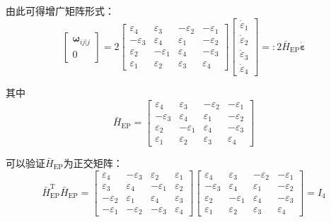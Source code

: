 由此可得增广矩阵形式：
\begin{equation}
\begin{bmatrix}
\boldsymbol{\omega}_{ij|j} \\ 0
\end{bmatrix}
= 2
\begin{bmatrix}
\varepsilon_4  & \varepsilon_3  & -\varepsilon_2 & -\varepsilon_1 \\
-\varepsilon_3 & \varepsilon_4  & \varepsilon_1  & -\varepsilon_2 \\
\varepsilon_2  & -\varepsilon_1 & \varepsilon_4  & -\varepsilon_3 \\
\varepsilon_1  & \varepsilon_2  & \varepsilon_3  & \varepsilon_4
\end{bmatrix}
\begin{bmatrix}
\dot{\varepsilon}_1 \\ \dot{\varepsilon}_2 \\ \dot{\varepsilon}_3 \\ \dot{\varepsilon}_4
\end{bmatrix}
=: 2\bar{H}_{\mathrm{EP}}\dot{\boldsymbol{\varepsilon}}
\label{eq:7.10}
\end{equation}

其中
\begin{equation}
\bar{H}_{\mathrm{EP}} =
\begin{bmatrix}
\varepsilon_4  & \varepsilon_3  & -\varepsilon_2 & -\varepsilon_1 \\
-\varepsilon_3 & \varepsilon_4  & \varepsilon_1  & -\varepsilon_2 \\
\varepsilon_2  & -\varepsilon_1 & \varepsilon_4  & -\varepsilon_3 \\
\varepsilon_1  & \varepsilon_2  & \varepsilon_3  & \varepsilon_4
\end{bmatrix}
\end{equation}

可以验证$\bar{H}_{\mathrm{EP}}$为正交矩阵：
\begin{equation}
\bar{H}_{\mathrm{EP}}^{\mathrm{T}}\bar{H}_{\mathrm{EP}} =
\begin{bmatrix}
\varepsilon_4  & -\varepsilon_3 & \varepsilon_2  & \varepsilon_1  \\
\varepsilon_3  & \varepsilon_4  & -\varepsilon_1 & \varepsilon_2  \\
-\varepsilon_2 & \varepsilon_1  & \varepsilon_4  & \varepsilon_3  \\
-\varepsilon_1 & -\varepsilon_2 & -\varepsilon_3 & \varepsilon_4
\end{bmatrix}
\begin{bmatrix}
\varepsilon_4  & \varepsilon_3  & -\varepsilon_2 & -\varepsilon_1 \\
-\varepsilon_3 & \varepsilon_4  & \varepsilon_1  & -\varepsilon_2 \\
\varepsilon_2  & -\varepsilon_1 & \varepsilon_4  & -\varepsilon_3 \\
\varepsilon_1  & \varepsilon_2  & \varepsilon_3  & \varepsilon_4
\end{bmatrix}
= I_4
\end{equation}

